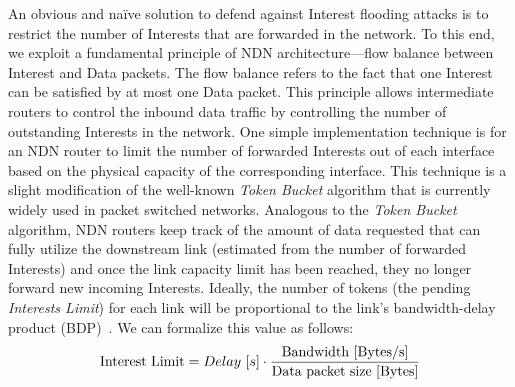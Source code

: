 




An obvious and na\"ive solution to defend against Interest flooding attacks is to restrict the number of Interests that are forwarded in the network. To this end, we exploit a 
 fundamental principle of NDN architecture---flow balance between Interest and Data packets. The flow balance refers to the fact that one Interest can be satisfied by at most one Data packet. This principle allows intermediate routers to control the inbound data traffic by controlling the number of outstanding Interests in the network. 
One simple implementation technique  is for an NDN router to limit the number of forwarded Interests out of each interface based on the physical capacity of the corresponding interface. This technique is a slight modification of the well-known {\it Token Bucket} algorithm that is currently widely used in packet switched networks. Analogous to the {\it Token Bucket} algorithm, NDN routers keep track of the amount of data requested that can fully utilize the downstream link (estimated from the number of forwarded Interests) and once the link capacity limit has been reached, they no longer forward new incoming Interests. Ideally, the number of tokens (the pending \emph{Interests Limit}) for each link will be proportional to the link's bandwidth-delay product (BDP)~\cite{tcp-survey}. We can formalize this value as follows:
%
\begin{equation}
\small \mathrm{Interest\ Limit} = Delay\ [s] \cdot \frac{\mathrm{Bandwidth\ [Bytes/s]}}{\mathrm{Data\ packet\ size\ [Bytes]}}
\end{equation}

